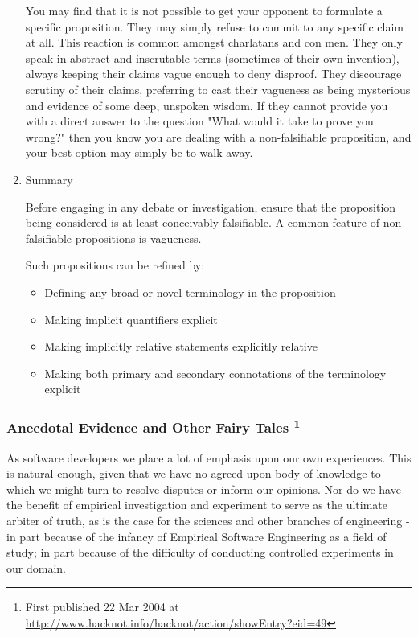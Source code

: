 \documentclass{article}
\begin{document}
\begin{enumerate}
You may find that it is not possible to get your opponent to formulate a
specific proposition. They may simply refuse to commit to any specific
claim at all. This reaction is common amongst charlatans and con men.
They only speak in abstract and inscrutable terms (sometimes of their
own invention), always keeping their claims vague enough to deny
disproof. They discourage scrutiny of their claims, preferring to cast
their vagueness as being mysterious and evidence of some deep, unspoken
wisdom. If they cannot provide you with a direct answer to the question
"What would it take to prove you wrong?" then you know you are dealing
with a non-falsifiable proposition, and your best option may simply be
to walk away.

\item Summary
\label{sec:orgheadline364}

Before engaging in any debate or investigation, ensure that the
proposition being considered is at least conceivably falsifiable. A
common feature of non-falsifiable propositions is vagueness.

Such propositions can be refined by:

\begin{itemize}
\item Defining any broad or novel terminology in the proposition
\item Making implicit quantifiers explicit
\item Making implicitly relative statements explicitly relative
\item Making both primary and secondary connotations of the terminology
explicit
\end{itemize}
\end{enumerate}

\subsubsection{Anecdotal Evidence and Other Fairy Tales \footnote{First published 22 Mar 2004 at
\url{http://www.hacknot.info/hacknot/action/showEntry?eid=49}}}
\label{sec:orgheadline379}

As software developers we place a lot of emphasis upon our own
experiences. This is natural enough, given that we have no agreed upon
body of knowledge to which we might turn to resolve disputes or inform
our opinions. Nor do we have the benefit of empirical investigation and
experiment to serve as the ultimate arbiter of truth, as is the case for
the sciences and other branches of engineering - in part because of the
infancy of Empirical Software Engineering as a field of study; in part
because of the difficulty of conducting controlled experiments in our
domain.
\end{document}
